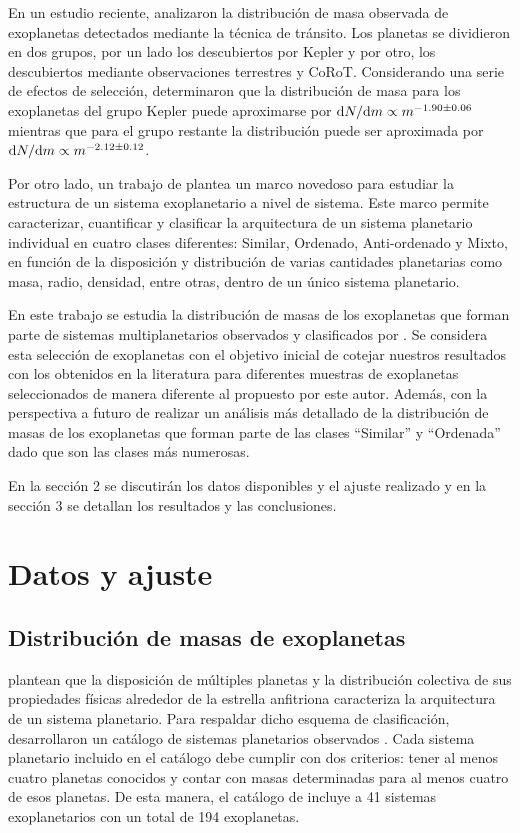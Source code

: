 \documentclass[baaa]{baaa}
\begin{document}
En un estudio reciente, \citet{ananyeva2020} analizaron la distribución de masa observada de exoplanetas detectados mediante la técnica de tránsito. Los planetas se dividieron en dos grupos, por un lado los descubiertos por Kepler y por otro, los descubiertos mediante observaciones terrestres y CoRoT. Considerando una serie de efectos de selección, determinaron que la distribución de masa para los exoplanetas del grupo Kepler puede aproximarse por $ {\rm d}N/{\rm d}m \propto m^{-1.90 \pm 0.06} $ mientras que para el grupo restante la distribución puede ser aproximada por ${\rm d}N/{\rm d} m \propto m^{-2.12 \pm 0.12}$.

Por otro lado, un trabajo de \citet{mishra2023} plantea un marco novedoso para estudiar la estructura de un sistema exoplanetario a nivel de sistema. Este marco permite caracterizar, cuantificar y clasificar la arquitectura de un sistema planetario individual en cuatro clases diferentes: Similar, Ordenado, Anti-ordenado y Mixto, en función de la disposición y distribución de varias cantidades planetarias como masa, radio, densidad, entre otras, dentro de un único sistema planetario.  

En este trabajo se estudia la distribución de masas de los exoplanetas que forman parte de sistemas multiplanetarios observados y clasificados por \citet{mishra2023}. Se considera esta selección de exoplanetas con el objetivo inicial de cotejar nuestros resultados con los obtenidos en la literatura  para diferentes muestras de exoplanetas seleccionados de manera diferente al propuesto por este autor. Además, con la perspectiva a futuro de realizar un análisis más detallado de la distribución de masas de los exoplanetas que forman parte de las clases ``Similar'' y ``Ordenada'' dado que son las clases más numerosas.

En la sección 2 se discutirán los datos disponibles y el ajuste realizado y en la sección 3 se detallan los resultados y las conclusiones.

\section{Datos y ajuste}
\subsection{Distribución de masas de exoplanetas}

\citet{mishra2021} plantean que la disposición de múltiples planetas y la distribución colectiva de sus propiedades físicas alrededor de la estrella anfitriona caracteriza la arquitectura de un sistema planetario. Para respaldar dicho esquema de clasificación, desarrollaron un catálogo de sistemas planetarios observados \citet{mishra2023}. Cada sistema planetario incluido en el catálogo debe cumplir con dos criterios: tener al menos cuatro planetas conocidos y contar con masas determinadas para al menos cuatro de esos planetas. De esta manera, el catálogo de \citet{mishra2023} incluye a 41 sistemas exoplanetarios con un total de 194 exoplanetas. 
\end{document}
